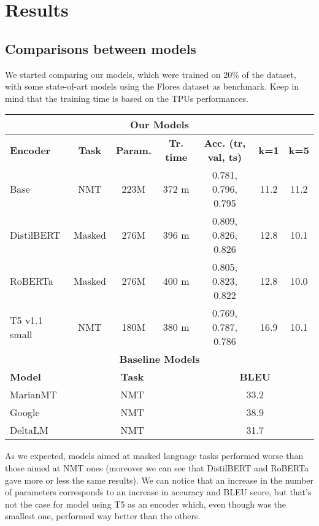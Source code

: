 \section{Results}
\subsection{Comparisons between models}
We started comparing our models, which were trained on 20\% of the dataset, with some state-of-art models using the Flores dataset as benchmark. Keep in mind that the training time is based on the TPUs performances.
\begin{table}[H]
\centering
\begin{tabular}{l|c|c|c|c|c|c}\hline \hline
\multicolumn{7}{c}{\textbf{Our Models}} \\\hline
\textbf{Encoder} & \textbf{Task} & \textbf{Param.} & \textbf{Tr. time} & \textbf{Acc. (tr, val, ts)} & \textbf{k=1} & \textbf{k=5}\\\hline
Base & NMT & 223M & 372 m & 0.781, 0.796, 0.795 & 11.2 & 11.2\\
DistilBERT & Masked & 276M & 396 m & 0.809, 0.826, 0.826 & 12.8 & 10.1\\
RoBERTa & Masked & 276M & 400 m & 0.805, 0.823, 0.822 & 12.8 & 10.0\\
T5 v1.1 small & NMT & 180M & 380 m & 0.769, 0.787, 0.786 & 16.9 & 10.1\\\hline \hline
\multicolumn{7}{c}{\textbf{Baseline Models}} \\\hline
\textbf{Model} & \multicolumn{3}{c|}{\textbf{Task}} & \multicolumn{3}{c}{\textbf{BLEU}}\\\hline
MarianMT & \multicolumn{3}{c|}{NMT} & \multicolumn{3}{c}{33.2}\\
Google & \multicolumn{3}{c|}{NMT} & \multicolumn{3}{c}{38.9}\\
DeltaLM & \multicolumn{3}{c|}{NMT} & \multicolumn{3}{c}{31.7}
\end{tabular}
\end{table}

As we expected, models aimed at masked language tasks performed worse than those aimed at NMT ones (moreover we can see that DistilBERT and RoBERTa gave more or less the same results). We can notice that an increase in the number of parameters corresponds to an increase in accuracy and BLEU score, but that's not the case for model using T5 as an encoder which, even though was the smallest one, performed way better than the others.
\vspace{3mm}

